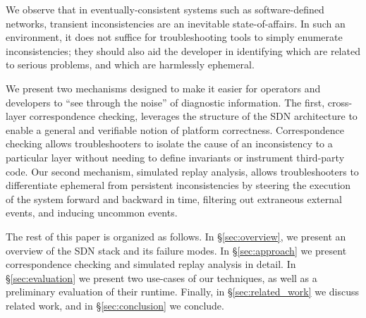 We observe that in eventually-consistent systems such as software-defined
networks, transient inconsistencies are an inevitable state-of-affairs.
In such an environment, it does not suffice for troubleshooting tools to
simply enumerate inconsistencies; they should also aid the developer
in identifying which are related to serious problems, and which are
harmlessly ephemeral. 

We present two mechanisms designed to make it easier for operators and
developers to ``see through the noise'' of diagnostic information. The first,
cross-layer correspondence checking, leverages the structure of the SDN
architecture to enable a general and verifiable notion of platform
correctness. Correspondence checking allows troubleshooters to isolate the
cause of 
an inconsistency to a particular layer without needing to define invariants or
instrument third-party code. Our second
mechanism, simulated replay analysis, allows troubleshooters 
to differentiate ephemeral from persistent inconsistencies by steering the
execution of the system forward and backward in time, filtering out extraneous
external events, and inducing uncommon events. 

The rest of this paper is organized as follows. In \S\ref{sec:overview},
we present an overview of the SDN stack and its failure modes.
In \S\ref{sec:approach} we present correspondence checking and simulated
replay analysis in detail. In \S\ref{sec:evaluation} we present
two use-cases of our techniques, as well as a preliminary evaluation
of their runtime. Finally, in \S\ref{sec:related_work} we discuss related work,
and in \S\ref{sec:conclusion} we conclude.
